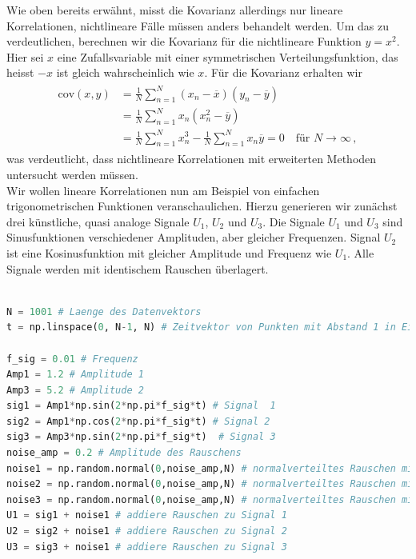 Wie oben bereits erwähnt, misst die Kovarianz allerdings nur lineare Korrelationen, nichtlineare Fälle müssen anders behandelt werden. Um das zu verdeutlichen, berechnen wir die Kovarianz für die nichtlineare Funktion $y = x^2$. Hier sei $x$ eine Zufallsvariable mit einer symmetrischen Verteilungsfunktion, das heisst $-x$ ist gleich wahrscheinlich wie $x$. Für die Kovarianz erhalten wir 
\begin{align}
    \begin{split}
        \text{cov}(x,y) &= \frac{1}{N} \sum_{n = 1}^N ( x_n - \overline{x} )( y_n - \overline{y} )\\
        &= \frac{1}{N} \sum_{n = 1}^N x_n ( x_n^2 - \overline{y} )\\
        &= \frac{1}{N} \sum_{n = 1}^N x_n^3  - \frac{1}{N} \sum_{n = 1}^N x_n \overline{y} = 0 \quad \text{f\"ur } N \rightarrow{ \infty} \, ,
    \end{split}
\end{align}
was verdeutlicht, dass nichtlineare Korrelationen mit erweiterten Methoden untersucht werden müssen. \\

Wir wollen lineare Korrelationen nun am Beispiel von einfachen trigonometrischen Funktionen veranschaulichen. Hierzu generieren wir zunächst drei künstliche, quasi analoge Signale $U_1$, $U_2$ und $U_3$. Die Signale $U_1$ und $U_3$ sind Sinusfunktionen verschiedener Amplituden, aber gleicher Frequenzen. Signal $U_2$ ist eine Kosinusfunktion mit gleicher Amplitude und Frequenz wie $U_1$. Alle Signale werden mit identischem Rauschen überlagert. 


\begin{lstlisting}[language = Python]

N = 1001 # Laenge des Datenvektors
t = np.linspace(0, N-1, N) # Zeitvektor von Punkten mit Abstand 1 in Einheit von Nanosekunden (als konkretes Beispiel)

f_sig = 0.01 # Frequenz 
Amp1 = 1.2 # Amplitude 1
Amp3 = 5.2 # Amplitude 2 
sig1 = Amp1*np.sin(2*np.pi*f_sig*t) # Signal  1  
sig2 = Amp1*np.cos(2*np.pi*f_sig*t) # Signal 2
sig3 = Amp3*np.sin(2*np.pi*f_sig*t)  # Signal 3  
noise_amp = 0.2 # Amplitude des Rauschens
noise1 = np.random.normal(0,noise_amp,N) # normalverteiltes Rauschen mit Standardabweichung noise_amp
noise2 = np.random.normal(0,noise_amp,N) # normalverteiltes Rauschen mit Standardabweichung noise_amp
noise3 = np.random.normal(0,noise_amp,N) # normalverteiltes Rauschen mit Standardabweichung noise_amp
U1 = sig1 + noise1 # addiere Rauschen zu Signal 1
U2 = sig2 + noise1 # addiere Rauschen zu Signal 2
U3 = sig3 + noise1 # addiere Rauschen zu Signal 3
\end{lstlisting}

